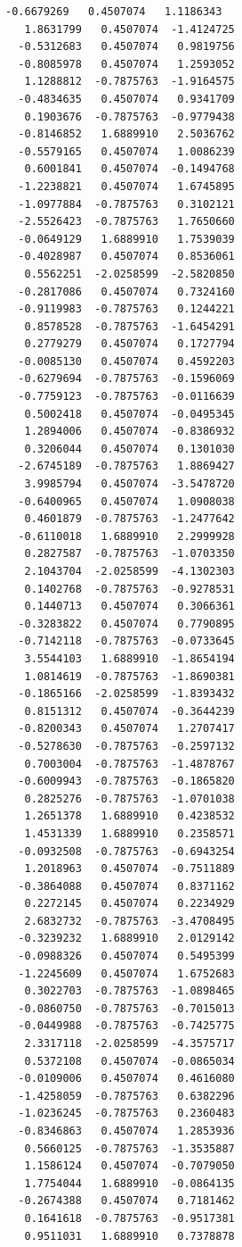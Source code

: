 \documentclass[11pt]{article}
\begin{document}
\begin{Verbatim}[commandchars=\\\{\}]
  -0.6679269   0.4507074   1.1186343
   1.8631799   0.4507074  -1.4124725
  -0.5312683   0.4507074   0.9819756
  -0.8085978   0.4507074   1.2593052
   1.1288812  -0.7875763  -1.9164575
  -0.4834635   0.4507074   0.9341709
   0.1903676  -0.7875763  -0.9779438
  -0.8146852   1.6889910   2.5036762
  -0.5579165   0.4507074   1.0086239
   0.6001841   0.4507074  -0.1494768
  -1.2238821   0.4507074   1.6745895
  -1.0977884  -0.7875763   0.3102121
  -2.5526423  -0.7875763   1.7650660
  -0.0649129   1.6889910   1.7539039
  -0.4028987   0.4507074   0.8536061
   0.5562251  -2.0258599  -2.5820850
  -0.2817086   0.4507074   0.7324160
  -0.9119983  -0.7875763   0.1244221
   0.8578528  -0.7875763  -1.6454291
   0.2779279   0.4507074   0.1727794
  -0.0085130   0.4507074   0.4592203
  -0.6279694  -0.7875763  -0.1596069
  -0.7759123  -0.7875763  -0.0116639
   0.5002418   0.4507074  -0.0495345
   1.2894006   0.4507074  -0.8386932
   0.3206044   0.4507074   0.1301030
  -2.6745189  -0.7875763   1.8869427
   3.9985794   0.4507074  -3.5478720
  -0.6400965   0.4507074   1.0908038
   0.4601879  -0.7875763  -1.2477642
  -0.6110018   1.6889910   2.2999928
   0.2827587  -0.7875763  -1.0703350
   2.1043704  -2.0258599  -4.1302303
   0.1402768  -0.7875763  -0.9278531
   0.1440713   0.4507074   0.3066361
  -0.3283822   0.4507074   0.7790895
  -0.7142118  -0.7875763  -0.0733645
   3.5544103   1.6889910  -1.8654194
   1.0814619  -0.7875763  -1.8690381
  -0.1865166  -2.0258599  -1.8393432
   0.8151312   0.4507074  -0.3644239
  -0.8200343   0.4507074   1.2707417
  -0.5278630  -0.7875763  -0.2597132
   0.7003004  -0.7875763  -1.4878767
  -0.6009943  -0.7875763  -0.1865820
   0.2825276  -0.7875763  -1.0701038
   1.2651378   1.6889910   0.4238532
   1.4531339   1.6889910   0.2358571
  -0.0932508  -0.7875763  -0.6943254
   1.2018963   0.4507074  -0.7511889
  -0.3864088   0.4507074   0.8371162
   0.2272145   0.4507074   0.2234929
   2.6832732  -0.7875763  -3.4708495
  -0.3239232   1.6889910   2.0129142
  -0.0988326   0.4507074   0.5495399
  -1.2245609   0.4507074   1.6752683
   0.3022703  -0.7875763  -1.0898465
  -0.0860750  -0.7875763  -0.7015013
  -0.0449988  -0.7875763  -0.7425775
   2.3317118  -2.0258599  -4.3575717
   0.5372108   0.4507074  -0.0865034
  -0.0109006   0.4507074   0.4616080
  -1.4258059  -0.7875763   0.6382296
  -1.0236245  -0.7875763   0.2360483
  -0.8346863   0.4507074   1.2853936
   0.5660125  -0.7875763  -1.3535887
   1.1586124   0.4507074  -0.7079050
   1.7754044   1.6889910  -0.0864135
  -0.2674388   0.4507074   0.7181462
   0.1641618  -0.7875763  -0.9517381
   0.9511031   1.6889910   0.7378878

\end{Verbatim}
\end{document}
